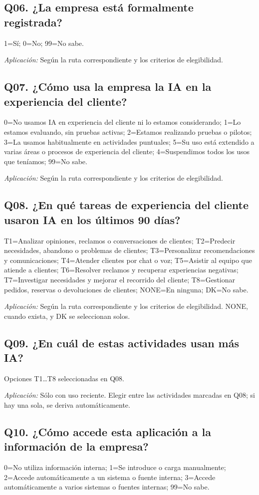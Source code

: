 \documentclass[12pt,letterpaper]{article}
\begin{document}
\subsection*{Q06. ¿La empresa está formalmente registrada?}
1=Sí; 0=No; 99=No sabe.

\emph{Aplicación:} Según la ruta correspondiente y los criterios de elegibilidad.

\subsection*{Q07. ¿Cómo usa la empresa la IA en la experiencia del cliente?}
0=No usamos IA en experiencia del cliente ni lo estamos considerando; 1=Lo estamos evaluando, sin pruebas activas; 2=Estamos realizando pruebas o pilotos; 3=La usamos habitualmente en actividades puntuales; 5=Su uso está extendido a varias áreas o procesos de experiencia del cliente; 4=Suspendimos todos los usos que teníamos; 99=No sabe.

\emph{Aplicación:} Según la ruta correspondiente y los criterios de elegibilidad.

\subsection*{Q08. ¿En qué tareas de experiencia del cliente usaron IA en los últimos 90 días?}
T1=Analizar opiniones, reclamos o conversaciones de clientes; T2=Predecir necesidades, abandono o problemas de clientes; T3=Personalizar recomendaciones y comunicaciones; T4=Atender clientes por chat o voz; T5=Asistir al equipo que atiende a clientes; T6=Resolver reclamos y recuperar experiencias negativas; T7=Investigar necesidades y mejorar el recorrido del cliente; T8=Gestionar pedidos, reservas o devoluciones de clientes; NONE=En ninguna; DK=No sabe.

\emph{Aplicación:} Según la ruta correspondiente y los criterios de elegibilidad. NONE, cuando exista, y DK se seleccionan solos.

\subsection*{Q09. ¿En cuál de estas actividades usan más IA?}
Opciones T1…T8 seleccionadas en Q08.

\emph{Aplicación:} Sólo con uso reciente. Elegir entre las actividades marcadas en Q08; si hay una sola, se deriva automáticamente.

\subsection*{Q10. ¿Cómo accede esta aplicación a la información de la empresa?}
0=No utiliza información interna; 1=Se introduce o carga manualmente; 2=Accede automáticamente a un sistema o fuente interna; 3=Accede automáticamente a varios sistemas o fuentes internas; 99=No sabe.
\end{document}
